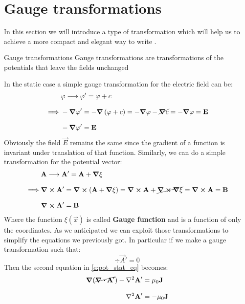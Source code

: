 \section{Gauge transformations}
In this section we will introduce a type of transformation which will help us to achieve a more compact and elegant way to write \maxwellref.
\begin{definition}{Gauge transformations}
  Gauge transformations are transformations of the potentials that leave the fields unchanged
\end{definition}
\noindent In the static case a simple gauge transformation for the electric field can be:
\begin{equation}
  \begin{split}
    &\varphi \longrightarrow \varphi' = \varphi + c\\[8pt]
    \implies &-\grad{\varphi'} = -\grad{\left(\varphi+ c\right)} = -\grad{\varphi} - \cancel{\grad{c}} = -\grad{\varphi} = \vb{E}\\[8pt]
    &-\grad{\varphi'} = \vb{E}
  \end{split}
\end{equation}
Obviously the field $\vec{E}$ remains the same since the gradient of a function is invariant under translation of that function. Similarly, we can do a simple transformation for the potential vector:
\begin{equation}
  \begin{split}
    &\vb{A} \longrightarrow \vb{A}' = \vb{A} + \grad{\xi}\\[8pt]
    \implies &\curl{\vb{A}'} = \curl{\left(\vb{A} + \grad{\xi}\right)} = \curl{\vb{A}} + \cancel{\curl{\grad{\xi}}} = \curl{\vb{A}} = \vb{B}\\[8pt]
    &\curl{\vb{A}'} = \vb{B}
  \end{split}
\end{equation}
Where the function $\xi (\vec{x})$ is called \textbf{Gauge function} and is a function of only the coordinates. As we anticipated we can exploit those transformations to simplify the equations we previously got. In particular if we make a gauge transformation such that:
\begin{equation}
  \div{\vec{A}'} = 0
\end{equation}
Then the second equation in \eqref{e:pot_stat_eq} becomes:
\begin{equation}
  \begin{split}
    \grad{(\cancel{\div{\vec{A}'}})} - \lap{\vec{A}'} &= \muz \vec{J}\\[8pt]
    \lap{\vec{A}'} &= -\muz \vec{J}
  \end{split}
\end{equation}
